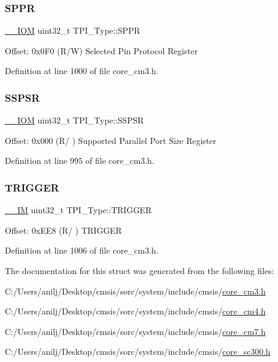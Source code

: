 \subsubsection{\texorpdfstring{S\+P\+PR}{SPPR}}
{\footnotesize\ttfamily \hyperlink{core__sc300_8h_ab6caba5853a60a17e8e04499b52bf691}{\+\_\+\+\_\+\+I\+OM} uint32\+\_\+t T\+P\+I\+\_\+\+Type\+::\+S\+P\+PR}

Offset\+: 0x0\+F0 (R/W) Selected Pin Protocol Register 

Definition at line 1000 of file core\+\_\+cm3.\+h.

\mbox{\label{struct_t_p_i___type_a7b72598e20066133e505bb781690dc22}} 
\subsubsection{\texorpdfstring{S\+S\+P\+SR}{SSPSR}}
{\footnotesize\ttfamily \hyperlink{core__sc300_8h_ab6caba5853a60a17e8e04499b52bf691}{\+\_\+\+\_\+\+I\+OM} uint32\+\_\+t T\+P\+I\+\_\+\+Type\+::\+S\+S\+P\+SR}

Offset\+: 0x000 (R/ ) Supported Parallel Port Size Register 

Definition at line 995 of file core\+\_\+cm3.\+h.

\mbox{\label{struct_t_p_i___type_a4d4cd2357f72333a82a1313228287bbd}} 
\subsubsection{\texorpdfstring{T\+R\+I\+G\+G\+ER}{TRIGGER}}
{\footnotesize\ttfamily \hyperlink{core__sc300_8h_a4cc1649793116d7c2d8afce7a4ffce43}{\+\_\+\+\_\+\+IM} uint32\+\_\+t T\+P\+I\+\_\+\+Type\+::\+T\+R\+I\+G\+G\+ER}

Offset\+: 0x\+E\+E8 (R/ ) T\+R\+I\+G\+G\+ER 

Definition at line 1006 of file core\+\_\+cm3.\+h.



The documentation for this struct was generated from the following files\+:\begin{DoxyCompactItemize}
\item 
C\+:/\+Users/anilj/\+Desktop/cmsis/sorc/system/include/cmsis/\hyperlink{core__cm3_8h}{core\+\_\+cm3.\+h}\item 
C\+:/\+Users/anilj/\+Desktop/cmsis/sorc/system/include/cmsis/\hyperlink{core__cm4_8h}{core\+\_\+cm4.\+h}\item 
C\+:/\+Users/anilj/\+Desktop/cmsis/sorc/system/include/cmsis/\hyperlink{core__cm7_8h}{core\+\_\+cm7.\+h}\item 
C\+:/\+Users/anilj/\+Desktop/cmsis/sorc/system/include/cmsis/\hyperlink{core__sc300_8h}{core\+\_\+sc300.\+h}\end{DoxyCompactItemize}
